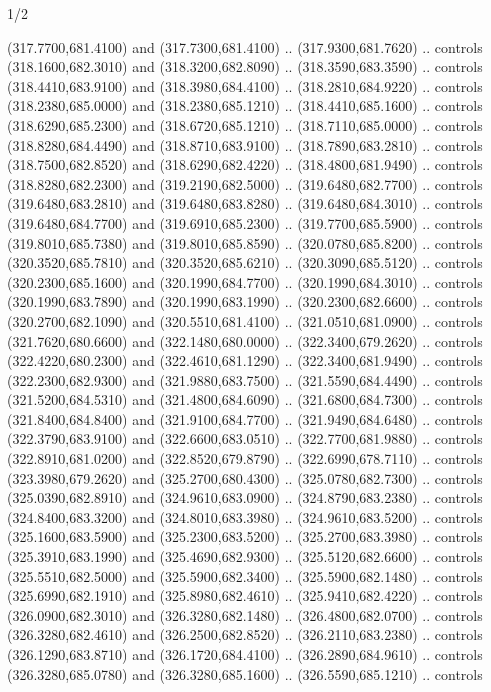 \begin{flagdescription}{1/2}
\begin{scope}[xshift=0.5\flaglength]
\begin{scope}[scale=0.00745\flagwidth,xshift=-12.1mm,yshift=41.7mm]
\begin{scope}[y=0.80pt, x=0.80pt, yscale=-1, xscale=1, inner sep=0pt, outer sep=0pt]
\begin{scope}[cm={{1.33333,0.0,0.0,-1.33333,(0.0,114.66667)}}]
\begin{scope}[scale=0.100]
  (317.7700,681.4100) and (317.7300,681.4100) .. (317.9300,681.7620) .. controls
  (318.1600,682.3010) and (318.3200,682.8090) .. (318.3590,683.3590) .. controls
  (318.4410,683.9100) and (318.3980,684.4100) .. (318.2810,684.9220) .. controls
  (318.2380,685.0000) and (318.2380,685.1210) .. (318.4410,685.1600) .. controls
  (318.6290,685.2300) and (318.6720,685.1210) .. (318.7110,685.0000) .. controls
  (318.8280,684.4490) and (318.8710,683.9100) .. (318.7890,683.2810) .. controls
  (318.7500,682.8520) and (318.6290,682.4220) .. (318.4800,681.9490) .. controls
  (318.8280,682.2300) and (319.2190,682.5000) .. (319.6480,682.7700) .. controls
  (319.6480,683.2810) and (319.6480,683.8280) .. (319.6480,684.3010) .. controls
  (319.6480,684.7700) and (319.6910,685.2300) .. (319.7700,685.5900) .. controls
  (319.8010,685.7380) and (319.8010,685.8590) .. (320.0780,685.8200) .. controls
  (320.3520,685.7810) and (320.3520,685.6210) .. (320.3090,685.5120) .. controls
  (320.2300,685.1600) and (320.1990,684.7700) .. (320.1990,684.3010) .. controls
  (320.1990,683.7890) and (320.1990,683.1990) .. (320.2300,682.6600) .. controls
  (320.2700,682.1090) and (320.5510,681.4100) .. (321.0510,681.0900) .. controls
  (321.7620,680.6600) and (322.1480,680.0000) .. (322.3400,679.2620) .. controls
  (322.4220,680.2300) and (322.4610,681.1290) .. (322.3400,681.9490) .. controls
  (322.2300,682.9300) and (321.9880,683.7500) .. (321.5590,684.4490) .. controls
  (321.5200,684.5310) and (321.4800,684.6090) .. (321.6800,684.7300) .. controls
  (321.8400,684.8400) and (321.9100,684.7700) .. (321.9490,684.6480) .. controls
  (322.3790,683.9100) and (322.6600,683.0510) .. (322.7700,681.9880) .. controls
  (322.8910,681.0200) and (322.8520,679.8790) .. (322.6990,678.7110) .. controls
  (323.3980,679.2620) and (325.2700,680.4300) .. (325.0780,682.7300) .. controls
  (325.0390,682.8910) and (324.9610,683.0900) .. (324.8790,683.2380) .. controls
  (324.8400,683.3200) and (324.8010,683.3980) .. (324.9610,683.5200) .. controls
  (325.1600,683.5900) and (325.2300,683.5200) .. (325.2700,683.3980) .. controls
  (325.3910,683.1990) and (325.4690,682.9300) .. (325.5120,682.6600) .. controls
  (325.5510,682.5000) and (325.5900,682.3400) .. (325.5900,682.1480) .. controls
  (325.6990,682.1910) and (325.8980,682.4610) .. (325.9410,682.4220) .. controls
  (326.0900,682.3010) and (326.3280,682.1480) .. (326.4800,682.0700) .. controls
  (326.3280,682.4610) and (326.2500,682.8520) .. (326.2110,683.2380) .. controls
  (326.1290,683.8710) and (326.1720,684.4100) .. (326.2890,684.9610) .. controls
  (326.3280,685.0780) and (326.3280,685.1600) .. (326.5590,685.1210) .. controls

\end{scope}
\end{scope}
\end{scope}
\end{scope}
\end{scope}
\end{flagdescription}
